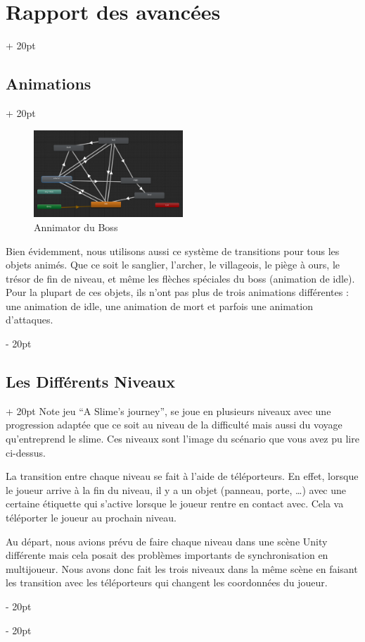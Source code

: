 \documentclass[a4paper, 12pt, twoside]{article}
\newcommand{\ind}[1][20pt]{\advance\leftskip + #1}
\newcommand{\deind}[1][20pt]{\advance\leftskip - #1}
\newenvironment{indt}[2][20pt]{#2 \par \ind[#1]}{\par \deind} %
\begin{document}
\begin{indt}{\section{Rapport des avancées}}
\begin{indt}{\subsection{Animations}}
            \begin{figure}[h]
                \centering
                \includegraphics[width=0.5\textwidth]{Annim2.png}
                \caption{Annimator du Boss}
                \label{fig:mesh1}
            \end{figure}

            Bien évidemment, nous utilisons aussi ce système de transitions pour tous les objets animés. Que ce soit le sanglier, l’archer, le villageois, le piège à ours, le trésor de fin de niveau, et même les flèches spéciales du boss (animation de idle). Pour la plupart de ces objets, ils n’ont pas plus de trois animations différentes : une animation de idle, une animation de mort et parfois une animation d'attaques.
        \end{indt}

        \begin{indt}{\subsection{Les Différents Niveaux}}
            Note jeu “A Slime’s journey”, se joue en plusieurs niveaux avec une progression adaptée que ce soit au niveau de la difficulté mais aussi du voyage qu'entreprend le slime. Ces niveaux sont l’image du scénario que vous avez pu lire ci-dessus.

            La transition entre chaque niveau se fait à l’aide de téléporteurs. En effet, lorsque le joueur arrive à la fin du niveau, il y a un objet (panneau, porte, …) avec une certaine étiquette qui s’active lorsque le joueur rentre en contact avec. Cela va téléporter le joueur au prochain niveau.

            Au départ, nous avions prévu de faire chaque niveau dans une scène Unity différente mais cela posait des problèmes importants de synchronisation en multijoueur. Nous avons donc fait les trois niveaux dans la même scène en faisant les transition avec les téléporteurs qui changent les coordonnées du joueur.


\end{indt}
\end{indt}
\end{document}
